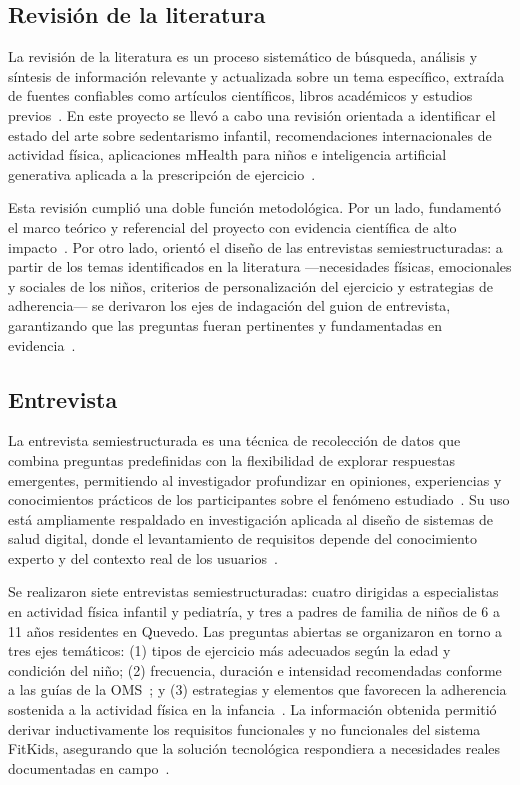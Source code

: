 			\subsection{Revisión de la literatura}
				La revisión de la literatura es un proceso sistemático de búsqueda, análisis y síntesis de información relevante y actualizada sobre un tema específico, extraída de fuentes confiables como artículos científicos, libros académicos y estudios previos~\cite{HernandezSampieri2014}. En este proyecto se llevó a cabo una revisión orientada a identificar el estado del arte sobre sedentarismo infantil, recomendaciones internacionales de actividad física, aplicaciones mHealth para niños e inteligencia artificial generativa aplicada a la prescripción de ejercicio~\cite{Guthold2020,Bull2020,Direito2017}.
				
				Esta revisión cumplió una doble función metodológica. Por un lado, fundamentó el marco teórico y referencial del proyecto con evidencia científica de alto impacto~\cite{WangGamif2025,Schoeppe2017}. Por otro lado, orientó el diseño de las entrevistas semiestructuradas: a partir de los temas identificados en la literatura ---necesidades físicas, emocionales y sociales de los niños, criterios de personalización del ejercicio y estrategias de adherencia--- se derivaron los ejes de indagación del guion de entrevista, garantizando que las preguntas fueran pertinentes y fundamentadas en evidencia~\cite{Creswell2018,HernandezSampieri2014}.
			
			\subsection{Entrevista}
				La entrevista semiestructurada es una técnica de recolección de datos que combina preguntas predefinidas con la flexibilidad de explorar respuestas emergentes, permitiendo al investigador profundizar en opiniones, experiencias y conocimientos prácticos de los participantes sobre el fenómeno estudiado~\cite{Creswell2018}. Su uso está ampliamente respaldado en investigación aplicada al diseño de sistemas de salud digital, donde el levantamiento de requisitos depende del conocimiento experto y del contexto real de los usuarios~\cite{HernandezSampieri2014}.
				
				Se realizaron siete entrevistas semiestructuradas: cuatro dirigidas a especialistas en actividad física infantil y pediatría, y tres a padres de familia de niños de 6 a 11 años residentes en Quevedo. Las preguntas abiertas se organizaron en torno a tres ejes temáticos: (1) tipos de ejercicio más adecuados según la edad y condición del niño; (2) frecuencia, duración e intensidad recomendadas conforme a las guías de la OMS~\cite{Bull2020}; y (3) estrategias y elementos que favorecen la adherencia sostenida a la actividad física en la infancia~\cite{Yao2015,VegaDiaz2023}. La información obtenida permitió derivar inductivamente los requisitos funcionales y no funcionales del sistema FitKids, asegurando que la solución tecnológica respondiera a necesidades reales documentadas en campo~\cite{Creswell2018}.
		
